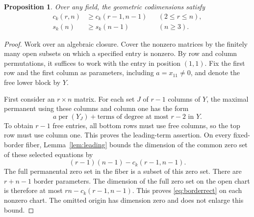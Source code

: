 \documentclass[11pt]{article}
\newtheorem{proposition}[theorem]{Proposition}
\theoremstyle{definition}\newtheorem{definition}[theorem]{Definition}
\theoremstyle{remark}\newtheorem{remark}[theorem]{Remark}
\DeclareMathOperator{\per}{per}
\numberwithin{equation}{section}
\begin{document}
\begin{proposition}\label{prop:border}
Over any field, the geometric codimensions satisfy
\begin{align}
 c_k(r,n)&\ge c_k(r-1,n-1)&& (2\le r\le n),\label{eq:borderrect}\\
 s_k(n)&\ge s_k(n-1)&& (n\ge3).\label{eq:bordersquare}
\end{align}
\end{proposition}
\begin{proof}
Work over an algebraic closure. Cover the nonzero matrices by the
finitely many open subsets on which a specified entry is nonzero.
By row and column permutations, it suffices to work with the entry
in position $(1,1)$. Fix the first row and the first column as
parameters, including $a=x_{11}\ne0$, and denote the free lower
block by $Y$.

First consider an $r\times n$ matrix. For each set $J$ of $r-1$
columns of $Y$, the maximal permanent using these columns and
column one has the form
\begin{equation}\label{eq:leadingrect}
 a\per(Y_J)+\text{terms of degree at most }r-2\text{ in }Y.
\end{equation}
To obtain $r-1$ free entries, all bottom rows must use free
columns, so the top row must use column one. This proves the
leading-term assertion. On every fixed-border fiber,
Lemma~\ref{lem:leading} bounds the dimension of the common zero
set of these selected equations by
\[
 (r-1)(n-1)-c_k(r-1,n-1).
\]
The full permanental zero set in the fiber is a subset of this
zero set. There are $r+n-1$ border parameters. The dimension of
the full zero set on the open chart is therefore at most
$rn-c_k(r-1,n-1)$. This proves \eqref{eq:borderrect} on each
nonzero chart. The omitted origin has dimension zero and does
not enlarge this bound.


\end{proof}
\end{document}
